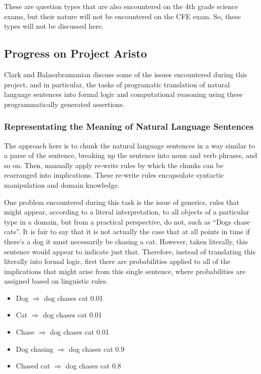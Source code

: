 These are question types that are also encountered on the 4th grade science exams, but their nature will not be encountered on the CFE exam.  So, these types will not be discussed here.

\subsection{Progress on Project Aristo}

Clark and Balasubramanian \cite{clark2014interpreting} discuss some of the issues encountered during this project, and in particular, the tasks of programatic translation of natural language sentences into formal logic and computational reasoning using these programmatically generated assertions.

\subsubsection{Representating the Meaning of Natural Language Sentences}

The approach here is to chunk the natural language sentences in a way similar to a parse of the sentence, breaking up the sentence into noun and verb phrases, and so on.  Then, manually apply re-write rules by which the chunks can be rearranged into implications.  These re-write rules encapsulate syntactic manipulation and domain knowledge.

One problem encountered during this task is the issue of generics, rules that might appear, according to a literal interpretation, to all objects of a particular type in a domain, but from a practical perspective, do not, such as ``Dogs chase cats”.  It is fair to say that it is not actually the case that at all points in time if there’s a dog it must necessarily be chasing a cat.  However, taken literally, this sentence would appear to indicate just that.  Therefore, instead of translating this literally into formal logic, first there are probabilities applied to all of the implications that might arise from this single sentence, where probabilities are assigned based on linguistic rules.

\begin{itemize}
\item Dog $\Rightarrow$ dog chases cat 0.01
\item Cat $\Rightarrow$ dog chases cat 0.01
\item Chase $\Rightarrow$ dog chases cat 0.01
\item Dog chasing $\Rightarrow$ dog chases cat 0.9
\item Chased cat $\Rightarrow$ dog chases cat 0.8 \cite{clark2015elementary}
\end{itemize}

